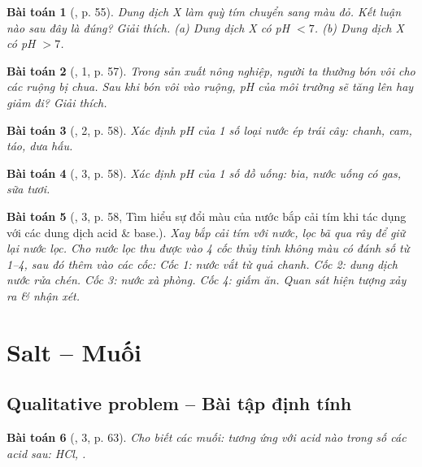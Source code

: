 \documentclass{article}
\newtheorem{baitoan}{Bài toán}
\begin{document}
\begin{baitoan}[\cite{SGK_KHTN_8_Canh_Dieu}, p. 55]
	Dung dịch X làm quỳ tím chuyển sang màu đỏ. Kết luận nào sau đây là đúng? Giải thích. (a) Dung dịch X có pH $< 7$. (b) Dung dịch X có pH $> 7$.
\end{baitoan}

\begin{baitoan}[\cite{SGK_KHTN_8_Canh_Dieu}, 1, p. 57]
	Trong sản xuất nông nghiệp, người ta thường bón vôi cho các ruộng bị chua. Sau khi bón vôi vào ruộng, pH của môi trường sẽ tăng lên hay giảm đi? Giải thích.
\end{baitoan}

\begin{baitoan}[\cite{SGK_KHTN_8_Canh_Dieu}, 2, p. 58]
	Xác định pH của 1 số loại nước ép trái cây: chanh, cam, táo, dưa hấu.
\end{baitoan}

\begin{baitoan}[\cite{SGK_KHTN_8_Canh_Dieu}, 3, p. 58]
	Xác định pH của 1 số đồ uống: bia, nước uống có gas, sữa tươi.
\end{baitoan}

\begin{baitoan}[\cite{SGK_KHTN_8_Canh_Dieu}, 3, p. 58, Tìm hiểu sự đổi màu của nước bắp cải tím khi tác dụng với các dung dịch acid \& base.]
	Xay bắp cải tím với nước, lọc bã qua rây để giữ lại nước lọc. Cho nước lọc thu được vào 4 cốc thủy tinh không màu có đánh số từ 1--4, sau đó thêm vào các cốc: Cốc 1: nước vắt từ quả chanh. Cốc 2: dung dịch nước rửa chén. Cốc 3: nước xà phòng. Cốc 4: giấm ăn. Quan sát hiện tượng xảy ra \& nhận xét.
\end{baitoan}


\section{Salt -- Muối}

\subsection{Qualitative problem -- Bài tập định tính}

\begin{baitoan}[\cite{SGK_KHTN_8_Canh_Dieu}, 3, p. 63]
	Cho biết các muối: \emph{} tương ứng với acid nào trong số các acid sau: \emph{HCl, }.
\end{baitoan}
\end{document}
